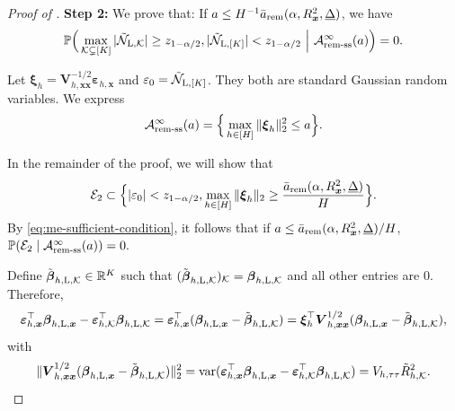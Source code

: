 \documentclass[12pt]{article}
\newcommand{\Lin}{\textnormal{L}}
\newcommand{\Prob}{\mathbb{P}}
\newcommand{\var}{\operatorname{var}}
\newcommand{\mk}{\mathcal{K}}
\newcommand{\rem}{\textnormal{rem}}
\newcommand{\remss}{\textnormal{rem-ss}}
\newcommand{\bs}{\boldsymbol}
\begin{document}
\begin{proof}[Proof of ]
\noindent\textbf{Step 2:} We prove that: If $a \leq  H^{-1}\bar{a}_{\rem}(\alpha, R^2_{\bs{x}}, \underline{\Delta})$, we have
\[
\Prob\Big(\max_{\mk \subsetneq [K]} |\tilde{\mathcal{N}}_{\Lin,\mk}| \geq z_{1-\alpha/2}, |\tilde{\mathcal{N}}_{\Lin,[K]}| < z_{1-\alpha/2}~\Big|~\mathcal{A}_{\remss}^{\infty}(a)\Big) = 0.
\]

Let $\bs{\xi}_{ h } = \bs{V}_{ h, \bs{x}\bs{x}}^{-1/2}\bs{\varepsilon}_{ h, \bs{x}} $ and  $\varepsilon_0 = \tilde{\mathcal{N}}_{\Lin,[K]} $. They both are standard Gaussian 
random variables. We express $$\mathcal{A}_{\remss}^{\infty}(a) = \Big\{\max_{h\in [H]} \|\bs{\xi}_{ h }\|_2^2 \leq a\Big\}.$$ 

In the remainder of the proof, we will show that
\begin{align}
\label{eq:me-sufficient-condition}
    \mathcal{E}_2  \subset \Big\{|\varepsilon_0| < z_{1-\alpha/2}, \max_{h\in [H]} \|\bs{\xi}_{ h }\|_2 \geq  \frac{\bar{a}_{\rem}(\alpha, R^2_{\bs{x}}, \underline{\Delta})}{H}\Big\}.
\end{align}
By \eqref{eq:me-sufficient-condition}, it follows that if $a \leq \bar{a}_{\rem}(\alpha, R^2_{\bs{x}}, \underline{\Delta})/H$, 
$\Prob(\mathcal{E}_2\mid\mathcal{A}_{\remss}^{\infty}(a)) = 0.$


 Define $\tilde{\bs{\beta}}_{h,\Lin,\mk}\in \mathbb{R}^K$ such that $(\tilde{\bs{\beta}}_{h,\Lin,\mk})_{\mk} = \bs{\beta}_{h,\Lin,\mk}$ and all other entries are $0$.
Therefore, 
\[
\bs{\varepsilon}_{ h, \bs{x}}^\top \bs{\beta}_{h, \Lin , \bs{x}}-\bs{\varepsilon}_{ h, \mk}^\top\bs{\beta}_{ h, \Lin, \mk} = \bs{\varepsilon}_{ h, \bs{x}}^\top (\bs{\beta}_{h, \Lin , \bs{x}}-\tilde{\bs{\beta}}_{h,\Lin,\mk}) = \bs{\xi}_{ h }^\top \bs{V}_{h,\bs{x}\bs{x}}^{1/2} (\bs{\beta}_{h, \Lin , \bs{x}}-\tilde{\bs{\beta}}_{h,\Lin,\mk}),
\]
with
\begin{align*}
  \| \bs{V}_{h,\bs{x}\bs{x}}^{1/2} (\bs{\beta}_{h, \Lin , \bs{x}}-\tilde{\bs{\beta}}_{h,\Lin,\mk})\|_2^2 = \var(\bs{\varepsilon}_{ h, \bs{x}}^\top \bs{\beta}_{h, \Lin , \bs{x}}-\bs{\varepsilon}_{ h, \mk}^\top\bs{\beta}_{ h, \Lin, \mk} ) = V_{ h,\tau\tau} \tilde{R}^2_{h,\mk}.
\end{align*}


\end{proof}
\end{document}
